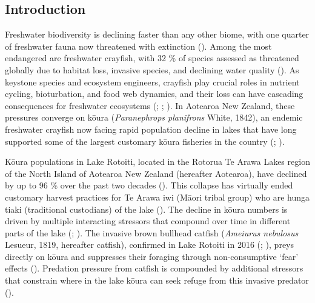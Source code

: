 \documentclass[
  letterpaper,
  DIV=11,
  numbers=noendperiod]{scrartcl}
\begin{document}
\subsection{Introduction}\label{introduction}

Freshwater biodiversity is declining faster than any other biome, with
one quarter of freshwater fauna now threatened with extinction
(). Among the most
endangered are freshwater crayfish, with 32 \% of species assessed as
threatened globally due to habitat loss, invasive species, and declining
water quality (). As
keystone species and ecosystem engineers, crayfish play crucial roles in
nutrient cycling, bioturbation, and food web dynamics, and their loss
can have cascading consequences for freshwater ecosystems
(;
; ). In Aotearoa New Zealand, these pressures converge on
kōura (\emph{Paranephrops planifrons} White, 1842), an endemic
freshwater crayfish now facing rapid population decline in lakes that
have long supported some of the largest customary kōura fisheries in the
country (;
).

Kōura populations in Lake Rotoiti, located in the Rotorua Te Arawa Lakes
region of the North Island of Aotearoa New Zealand (hereafter Aotearoa),
have declined by up to 96 \% over the past two decades
(). This collapse has
virtually ended customary harvest practices for Te Arawa iwi (Māori
tribal group) who are hunga tiaki (traditional custodians) of the lake
(). The decline
in kōura numbers is driven by multiple interacting stressors that
compound over time in different parts of the lake
(;
). The invasive brown bullhead
catfish (\emph{Ameiurus nebulosus} Lesueur, 1819, hereafter catfish),
confirmed in Lake Rotoiti in 2016 (; ), preys directly on
kōura and suppresses their foraging through non-consumptive `fear'
effects (). Predation
pressure from catfish is compounded by additional stressors that
constrain where in the lake kōura can seek refuge from this invasive
predator ().
\end{document}
